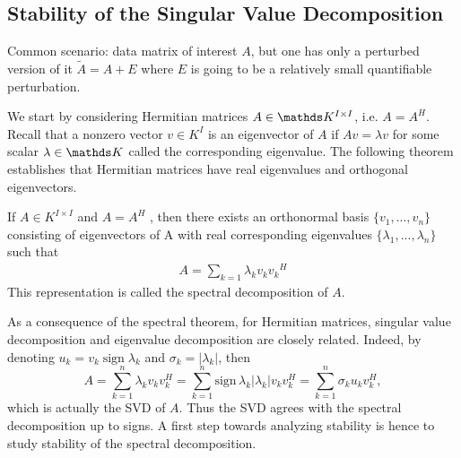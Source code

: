\documentclass[a4paper, english, headtopline=0.08em, headsepline=0.04em, left = 1cm, right = 1cm, DIV=15]{article}
\begin{document}
\subsection{Stability of the Singular Value
Decomposition}
Common scenario: data matrix of interest $A$, but one has
only a perturbed version of it $\tilde{A} = A + E$ where $E$ is going
to be a relatively small quantifiable perturbation.

We start by considering Hermitian matrices $A\in \KK^{I \times I}$, i.e.
$A = A^H$.
Recall that a nonzero vector $v\in K^{I}$ is an eigenvector of $A$
if $Av = \lambda v$ for some scalar $\lambda\in \KK$ called the 
corresponding eigenvalue.  The following theorem establishes that Hermitian
matrices have real eigenvalues and orthogonal
eigenvectors.
\begin{theorem}
If $A \in K^{I \times I}$ and $A = A^H$ , then there exists an orthonormal basis
$\{v_1, ..., v_n\}$ consisting of eigenvectors of A with real corresponding 
eigenvalues $\{\lambda_1, ..., \lambda_n\}$ such that
	\begin{align*}
		A = \sum_{k=1} \lambda_k v_k {v_k}^H
	\end{align*}
	This representation is called the spectral decomposition of $A$.
\end{theorem}
As a consequence of the spectral theorem, for Hermitian
matrices, singular value decomposition and eigenvalue
decomposition are closely related.
Indeed, by denoting $u_{k}=v_{k}\operatorname{sign}\lambda_{k}$ and $\sigma_{k}=|\lambda_{k}|$, then
$$A=\sum_{k=1}^{n}\lambda_{k}v_{k}v_{k}^{H}=\sum_{k=1}^{n}\mathrm{sign}\,\lambda_{k}|\lambda_{k}|v_{k}v_{k}^{H}=\sum_{k=1}^{n}\sigma_{k}u_{k}v_{k}^{H},$$
which is actually the SVD of $A$. Thus the SVD agrees with the spectral decomposition up
to signs. A first step towards analyzing stability is hence to study
stability of the spectral decomposition.
\end{document}
